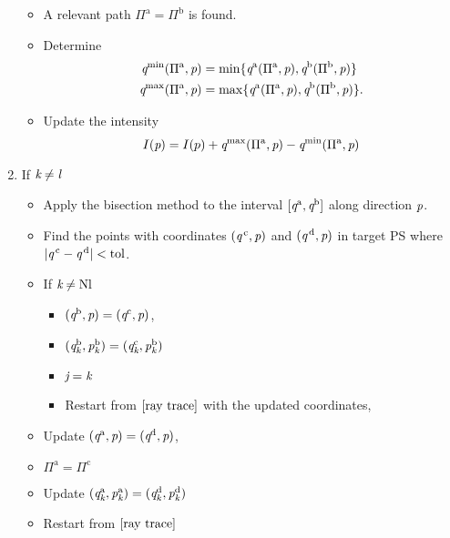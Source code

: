 \begin{enumerate}
\begin{itemize}
\item A relevant path $\Pi^{\textrm{a}} = \Pi^{\textrm{b}}$ is found. 
\item Determine 
\begin{equation*}
\begin{aligned}
\textit{q}^{\textrm{min}}(\Pi^{\textrm{a}}, \textit{p})&=\min\{\textit{q}^{\textrm{a}}(\Pi^{\textrm{a}}, \textit{p}), \textit{q}^{\textrm{b}}(\Pi^{\textrm{b}}, \textit{p})\}\\ 
\textit{q}^{\textrm{max}}(\Pi^{\textrm{a}}, \textit{p})&=\max\{\textit{q}^{\textrm{a}}(\Pi^{\textrm{a}}, \textit{p}), \textit{q}^{\textrm{b}}(\Pi^{\textrm{b}}, \textit{p})\}.
\end{aligned}
\end{equation*}
\item Update the intensity $$I(\textit{p}) = I(p)+\textit{q}^{\textrm{max}}(\Pi^{\textrm{a}}, \textit{p})-\textit{q}^{\textrm{min}}(\Pi^{\textrm{a}}, \textit{p})$$
\end{itemize}
\item If $\textit{k}\neq\textit{l}$ 
\begin{itemize}
\item Apply the bisection method to the interval $[\textit{q}^{\textrm{a}}, \textit{q}^{\textrm{b}}]$ along direction $\textit{p}$.
\item Find the points with coordinates $(\textit{q}^{\,\textrm{c}}, \textit{p})$ and $(\textit{q}^{\,\textrm{d}}, \textit{p})$ in target PS  where $|\textit{q}^{\,\textrm{c}}-\textit{q}^{\,\textrm{d}}|<\textrm{tol}$. 
\item If $\textit{k}\neq\textrm{Nl}$
\begin{itemize}
\item $(\textit{q}^{\textrm{b}}, \textit{p}) = (\textit{q}^{\textrm{c}}, \textit{p})$,
\item $(\textit{q}_{\textit{k}}^{\textrm{b}}, \textit{p}_{\textit{k}}^{\textrm{b}}) = (\textit{q}_{\textit{k}}^{\textrm{c}}, \textit{p}_{\textit{k}}^{\textrm{b}})$

\item $\textit{j} = \textit{k}$

\item Restart from $\ref{ray trace}$ with the updated coordinates,
\end{itemize}
\item Update $(\textit{q}^{\textrm{a}}, \textit{p} )= (\textit{q}^{\textrm{d}}, \textit{p})$,
\item $\Pi^{\textrm{a}} = \Pi^{\textrm{c}}$
\item Update $(\textit{q}_{\textit{k}}^{\textrm{a}}, \textit{p}_{\textit{k}}^{\textrm{a}}) = (\textit{q}_{\textit{k}}^{\textrm{d}}, \textit{p}_{\textit{k}}^{\textrm{d}})$
\item Restart from $\ref{ray trace}$

\end{itemize}

\end{enumerate}
